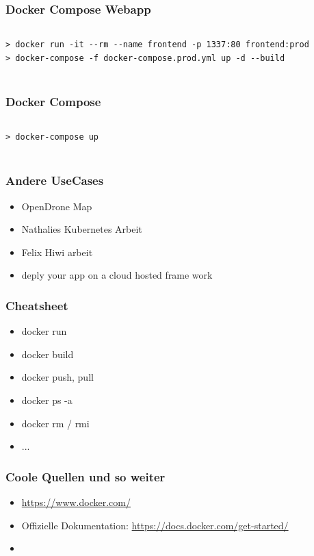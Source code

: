 \documentclass[22pt]{beamer}
\begin{document}
\begin{frame}[fragile]
    \frametitle{Docker Compose Webapp}
    \inputminted[fontsize=\footnotesize, frame=lines]{dockerfile}{../examples/React/docker-compose.prod.yml}
\begin{verbatim}
> docker run -it --rm --name frontend -p 1337:80 frontend:prod
> docker-compose -f docker-compose.prod.yml up -d --build
    
\end{verbatim}
\end{frame}

\begin{frame}[fragile]
    \frametitle{Docker Compose}
    \inputminted[fontsize=\footnotesize, frame=lines]{dockerfile}{../examples/docker-compose.yml}
\begin{verbatim}
> docker-compose up
    
\end{verbatim}
\end{frame}

%
\begin{frame}[t]
    \frametitle{Andere UseCases}
    \begin{itemize}
        \item OpenDrone Map
        \item Nathalies Kubernetes Arbeit
        \item Felix Hiwi arbeit
        \item deply your app on a cloud hosted frame work
    \end{itemize}
\end{frame}

\begin{frame}[t]
    \frametitle{Cheatsheet}
    \begin{itemize}
        \item docker run
        \item docker build
        \item docker push, pull
        \item docker ps -a
        \item docker rm / rmi
        \item ...
    \end{itemize} 
\end{frame}

\begin{frame}[t]
    \frametitle{Coole Quellen und so weiter}
    \begin{itemize}
        \item \href{https://www.docker.com/}{https://www.docker.com/}
        \item Offizielle Dokumentation: \href{https://docs.docker.com/get-started/}{https://docs.docker.com/get-started/}
        \item 
    \end{itemize} 
\end{frame}
\end{document}
